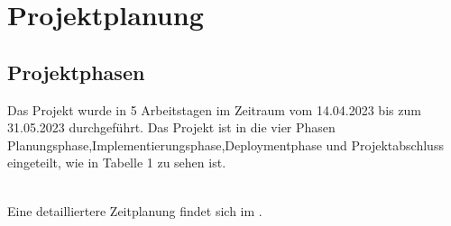 \section{Projektplanung} 
\label{sec:Projektplanung}


\subsection{Projektphasen}
\label{sec:Projektphasen}

Das Projekt wurde in 5 Arbeitstagen im Zeitraum vom 14.04.2023 bis zum 31.05.2023 durchgeführt. Das Projekt ist in die vier Phasen \glqq Planungsphase\grqq{},\glqq Implementierungsphase\grqq{},\glqq Deploymentphase\grqq{} und \glqq Projektabschluss\grqq{} eingeteilt, wie in Tabelle 1 zu sehen ist.
\begin{comment}

	\item Verfeinerung der Zeitplanung, die bereits im Projektantrag vorgestellt wurde.
\paragraph{Beispiel}
Tabelle~\ref{tab:Zeitplanung} zeigt ein Beispiel für eine grobe Zeitplanung.
\end{comment}
\\
Eine detailliertere Zeitplanung findet sich im .


